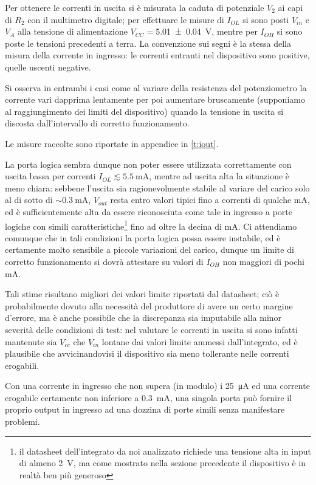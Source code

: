 \documentclass[a4paper,11pt]{article}
\begin{document}
Per ottenere le correnti in uscita si è misurata la caduta di potenziale  $V_2$ ai capi di $R_{2}$ con il multimetro digitale; per effettuare le misure di $I_{OL}$ si sono posti $V_{in}$ e $V_A$ alla tensione di alimentazione $V_{CC}=$\SI{5.01 \pm 0.04}{\volt}, mentre per $I_{OH}$ si sono poste le tensioni precedenti a terra. La convenzione sui segni è la
stessa della misura della corrente in ingresso: le correnti entranti
nel dispositivo sono positive, quelle uscenti negative.

Si osserva in entrambi i casi come al variare della resistenza del
potenziometro la corrente vari dapprima lentamente per poi aumentare
bruscamente (supponiamo al raggiungimento dei limiti del dispositivo) quando
la tensione in uscita si discosta dall'intervallo di
corretto funzionamento.

Le misure raccolte sono riportate in appendice in \tablename{ \ref{t:iout}}.

La porta logica sembra dunque non poter essere utilizzata correttamente con
uscita bassa per correnti $I_{OL} \lesssim \SI{5.5}{\mA}$, mentre
ad uscita alta la situazione è meno chiara: sebbene l'uscita sia
ragionevolmente stabile al variare del carico solo al di sotto di
$\sim \SI{0.3}{\mA}$, $V_{out}$ resta entro valori tipici fino a correnti
di qualche \si{\mA}, ed è sufficientemente alta da essere riconosciuta
come tale in ingresso a porte logiche con simili caratteristiche\footnote{il
datasheet dell'integrato da noi analizzato richiede una tensione alta in
input di almeno \SI{2}{\V}, ma come mostrato nella sezione precedente il
dispositivo è in realtà ben più generoso} fino ad oltre la decina di \si{\mA}.
Ci attendiamo comunque che in tali condizioni la porta logica possa essere
instabile, ed è certamente molto sensibile a piccole variazioni del
carico, dunque un limite di corretto funzionamento si dovrà attestare
su valori di $I_{OH}$ non maggiori di pochi \si{\mA}.

Tali stime risultano migliori dei valori limite riportati dal datasheet;
ciò è probabilmente dovuto alla necessità del produttore di avere un certo
margine d'errore, ma è anche possibile che la discrepanza sia imputabile
alla minor severità delle condizioni di test: nel valutare le correnti in
uscita si sono infatti mantenute sia $V_{cc}$ che $V_{in}$ lontane dai
valori limite ammessi dall'integrato, ed è plausibile che avvicinandovisi
il dispositivo sia meno tollerante nelle correnti erogabili.

Con una corrente in ingresso che non supera (in modulo) i \SI{25}{\uA} ed
una corrente erogabile certamente non inferiore a \SI{0.3}{\mA},
una singola porta può fornire il proprio output in ingresso ad una dozzina
di porte simili senza manifestare problemi.
\end{document}
